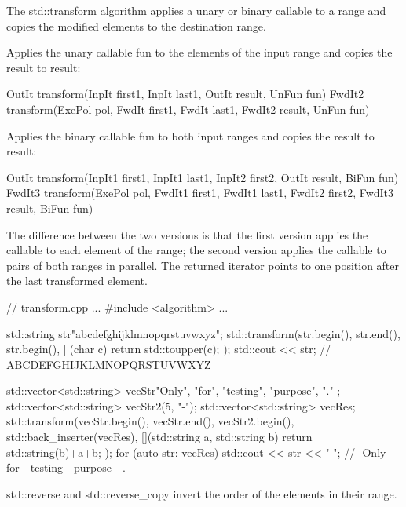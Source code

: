 
The std::transform algorithm applies a unary or binary callable to a range and copies the modified elements to the destination range.

Applies the unary callable fun to the elements of the input range and copies the result to result:

\begin{cpp}
OutIt transform(InpIt first1, InpIt last1, OutIt result, UnFun fun)
FwdIt2 transform(ExePol pol, FwdIt first1, FwdIt last1, FwdIt2 result, UnFun fun)
\end{cpp}

Applies the binary callable fun to both input ranges and copies the result to result:

\begin{cpp}
OutIt transform(InpIt1 first1, InpIt1 last1, InpIt2 first2, OutIt result,
			    BiFun fun)
FwdIt3 transform(ExePol pol, FwdIt1 first1, FwdIt1 last1,
				 FwdIt2 first2, FwdIt3 result, BiFun fun)
\end{cpp}

The difference between the two versions is that the first version applies the callable to each element of the range; the second version applies the callable to pairs of both ranges in parallel. The returned iterator points to one position after the last transformed element.


\begin{cpp}
// transform.cpp
...
#include <algorithm>
...

std::string str{"abcdefghijklmnopqrstuvwxyz"};
std::transform(str.begin(), str.end(), str.begin(),
				[](char c){ return std::toupper(c); });
std::cout << str; // ABCDEFGHIJKLMNOPQRSTUVWXYZ

std::vector<std::string> vecStr{"Only", "for", "testing", "purpose", "." };
std::vector<std::string> vecStr2(5, "-");
std::vector<std::string> vecRes;
std::transform(vecStr.begin(), vecStr.end(),
			   vecStr2.begin(), std::back_inserter(vecRes),
			   [](std::string a, std::string b){ return std::string(b)+a+b; });
for (auto str: vecRes) std::cout << str << " ";
                             // -Only- -for- -testing- -purpose- -.-
\end{cpp}


std::reverse and std::reverse\_copy invert the order of the elements in their range.

